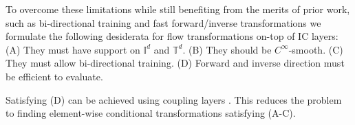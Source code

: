 \documentclass{article}
\newcommand{\TODO}[1]{{\color{orange} \textbf{TODO:} #1 }}
\begin{document}
To overcome these limitations while still benefiting from the merits of prior work, such as bi-directional training and fast forward/inverse transformations we formulate the following desiderata for flow transformations on-top of IC layers:
(A) They must have support on $\mathbb{I}^{d}$ and $\mathbb{T}^d$.
(B) They should be $C^{\infty}$-smooth.
(C) They must allow bi-directional training.
(D) Forward and inverse direction must be efficient to evaluate.



Satisfying (D) can be achieved using coupling layers \cite{dinh2014nice, dinh2016rnvp}. This reduces the problem to finding element-wise conditional transformations satisfying (A-C).





\end{document}
